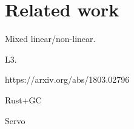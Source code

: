 \section{Related work}

Mixed linear/non-linear.

L3.

https://arxiv.org/abs/1803.02796

Rust+GC

Servo
